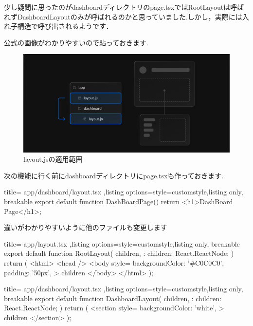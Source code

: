 少し疑問に思ったのがdashboardディレクトリのpage.tsxではRootLayoutは呼ばれずDashboardLayoutのみが呼ばれるのかと思っていました.しかし，実際には入れ子構造で呼び出されるようです．

公式の画像がわかりやすいので貼っておきます.
\begin{figure}[H]
  \centering
  \includegraphics[width=12cm]{./image/03-Tech/chap4/02.png}
  \caption{layout.jsの適用範囲}
\end{figure}

次の機能に行く前にdashboardディレクトリにpage.tsxも作っておきます.
\begin{tcblisting}{title={
        app/dashboard/layout.tsx
      },listing options={style=customstyle},listing only, breakable}
  export default function DashBoardPage() {
      return <h1>DashBoard Page</h1>;
  }

\end{tcblisting}


違いがわかりやすいように他のファイルも変更します
\begin{tcblisting}{title={
        app/layout.tsx
      },listing options={style=customstyle},listing only, breakable}
      export default function RootLayout({
        children,
      }: {
        children: React.ReactNode;
      }) {
        return (
          <html>
            <head />
            <body
              style={{
                backgroundColor: '#C0C0C0',
                padding: '50px',
              }}
            >
              {children}
            </body>
          </html>
        );
      }
      

\end{tcblisting}




\begin{tcblisting}{title={
        app/dashboard/layout.tsx
      },listing options={style=customstyle},listing only, breakable}
      export default function DashboardLayout({
        children,
      }: {
        children: React.ReactNode;
      }) {
        return (
          <section
            style={{
              backgroundColor: 'white',            
            }}
          >
            {children}
          </section>
        );
      }
\end{tcblisting}



